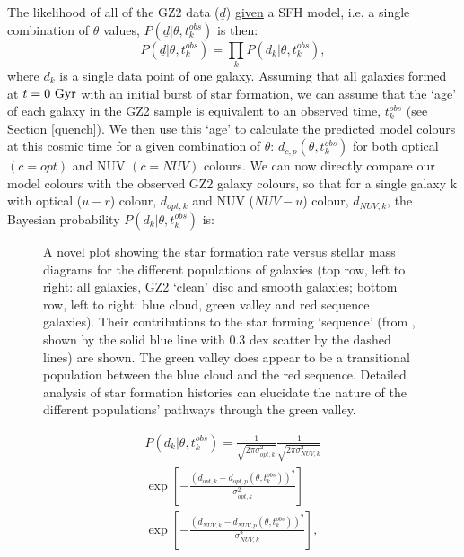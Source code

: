 \documentclass{mn2e}
\begin{document}
The likelihood of all of the GZ2 data ($\underline{d}$) \underline{given} a SFH model, i.e. a single combination of $\theta$ values, $P(\underline{d}|\theta, t_{k}^{obs})$ is then:
\begin{equation}
P(\underline{d}|\theta, t_{k}^{obs}) = \prod_{k} P(d_{k}|\theta, t_{k}^{obs}),
\end{equation}
where $d_{k}$ is a single data point of one galaxy. Assuming that all galaxies formed at $t=0~\rm{Gyr}$ with an initial burst of star formation, we can assume that the `age' of each galaxy in the GZ2 sample is equivalent to an observed time, $t^{obs}_{k}$ (see Section \ref{quench}). We then use this  `age' to calculate the predicted model colours at this cosmic time for a given combination of $\theta$: $d_{c,p}(\theta, t^{obs}_{k})$ for both optical $(c=opt)$ and NUV $(c=NUV)$ colours. We can now directly compare our model colours with the observed GZ2 galaxy colours, so that for a single galaxy k with optical ($u-r$) colour, $d_{opt, k}$ and NUV ($NUV-u$) colour, $d_{NUV,k}$, the Bayesian probability $P(d_{k}|\theta, t^{obs}_{k})$ is:

\begin{figure}
\caption{A novel plot showing the star formation rate versus stellar mass diagrams for the different populations of galaxies  (top row, left to right: all galaxies, GZ2 `clean' disc and smooth galaxies; bottom row, left to right: blue cloud, green valley and red sequence galaxies). Their contributions to the star forming `sequence' (from \citet{Peng}, shown by the solid blue line with 0.3 dex scatter by the dashed lines) are shown. The green valley does appear to be a transitional population between the blue cloud and the red sequence. Detailed analysis of star formation histories can elucidate the nature of the different populations' pathways through the green valley.}
\label{sfr_mass_sub}
\end{figure}


\begin{multline}\label{like}
P(d_{k}|\theta, t^{obs}_{k}) = \frac{1}{\sqrt{2\pi\sigma_{opt, k}^2}}\frac{1}{\sqrt{2\pi\sigma_{NUV, k}^2}} \\ \exp{\left[ - \frac{(d_{opt, k} - d_{opt, p}(\theta, t_{k}^{obs}))^2}{\sigma_{opt, k}^2} \right]} \\ \exp{\left[ - \frac{(d_{NUV, k} - d_{NUV, p}(\theta, t_{k}^{obs}))^2}{\sigma_{NUV, k}^2} \right]},
\end{multline}
\end{document}
